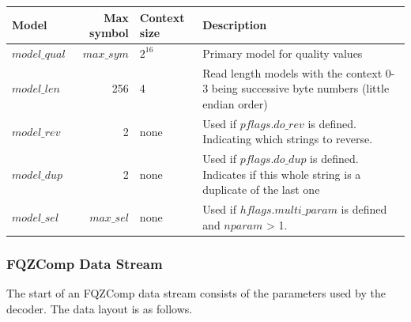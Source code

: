 \documentclass[a4paper]{article}
\begin{document}
\begin{table}[h]
\centering
\begin{tabular}{lrlp{9cm}}
 Model & Max symbol & Context size & Description\\
\hline
$model\_qual$ & $max\_sym$ & $2^{16}$ & Primary model for quality values \\
$model\_len$  & 256        & 4       & Read length models with the context 0-3 being successive byte numbers (little endian order) \\
$model\_rev$  & 2          & none    & Used if $pflags.do\_rev$ is defined.  Indicating which strings to reverse. \\
$model\_dup$  & 2          & none    & Used if $pflags.do\_dup$ is defined.  Indicates if this whole string is a duplicate of the last one \\
$model\_sel$  & $max\_sel$ & none    & Used if $hflags.multi\_param$ is defined and $nparam$ > 1. \\
\end{tabular}
\end{table}

\pagebreak
\subsubsection*{FQZComp Data Stream}

The start of an FQZComp data stream consists of the parameters used by
the decoder. The data layout is as follows.
\end{document}
